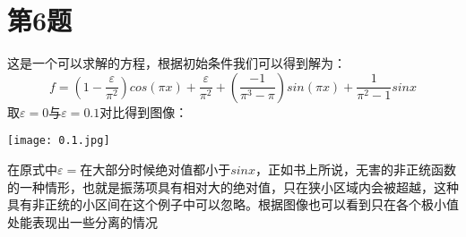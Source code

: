 \documentclass[UTF8]{ctexart}
\begin{document}
	
	\section{第6题}
	这是一个可以求解的方程，根据初始条件我们可以得到解为：
	\[f=\left ( 1-\frac{\varepsilon }{\pi ^{2}}\right )cos\left ( \pi x\right )+\frac{\varepsilon }{\pi ^{2}}+\left ( \frac{-1}{\pi ^{3}-\pi }\right )sin\left ( \pi x\right )+\frac{1}{\pi ^{2}-1}sinx\]
	取$\varepsilon=0$与$\varepsilon=0.1$对比得到图像：
	
	\texttt{[image: 0.1.jpg]}
	
	在原式中$\varepsilon=$在大部分时候绝对值都小于$sinx$，正如书上所说，无害的非正统函数的一种情形，也就是振荡项具有相对大的绝对值，只在狭小区域内会被超越，这种具有非正统的小区间在这个例子中可以忽略。根据图像也可以看到只在各个极小值处能表现出一些分离的情况

	
\end{document}
